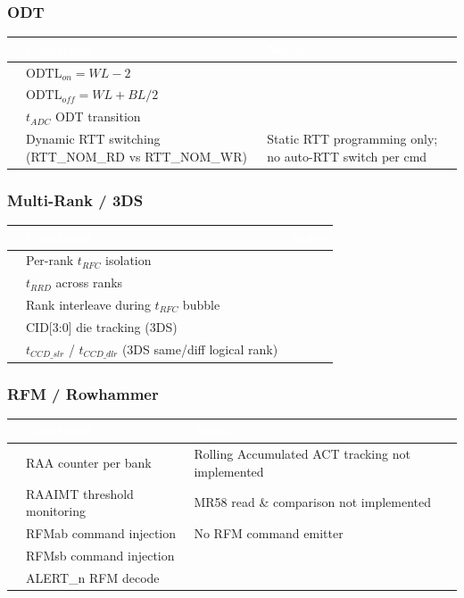 \documentclass[11pt,a4paper]{article}
\newcommand{\THead}[1]{\cellcolor{navy}\textcolor{white}{\small\textbf{#1}}}
\newcommand{\RA}{\rowcolor{lgray}}
\newcommand{\RB}{\rowcolor{sky!30}}
\newcommand{\cmark}{\textcolor{grn}{\ding{51}}}
\newcommand{\xmark}{\textcolor{red}{\ding{55}}}
\begin{document}
\subsubsection*{ODT}
\begin{center}
\begin{tabularx}{\linewidth}{@{} c l X @{}}
\toprule
\THead{} & \THead{Constraint} & \THead{Notes} \\
\midrule
\RA\cmark & $\text{ODTL}_{on} = WL-2$ & \\
\RB\cmark & $\text{ODTL}_{off} = WL+BL/2$ & \\
\RA\cmark & $t_{ADC}$ ODT transition & \\
\RB\xmark & Dynamic RTT switching (RTT\_NOM\_RD vs RTT\_NOM\_WR) &
  Static RTT programming only; no auto-RTT switch per cmd \\
\bottomrule
\end{tabularx}
\end{center}

\subsubsection*{Multi-Rank / 3DS}
\begin{center}
\begin{tabularx}{\linewidth}{@{} c l X @{}}
\toprule
\THead{} & \THead{Constraint} & \THead{Notes} \\
\midrule
\RA\cmark & Per-rank $t_{RFC}$ isolation & \\
\RB\cmark & $t_{RRD}$ across ranks & \\
\RA\cmark & Rank interleave during $t_{RFC}$ bubble & \\
\RB\cmark & CID[3:0] die tracking (3DS) & \\
\RA\cmark & $t_{CCD\_slr}$ / $t_{CCD\_dlr}$ (3DS same/diff logical rank) & \\
\bottomrule
\end{tabularx}
\end{center}

\subsubsection*{RFM / Rowhammer}
\begin{center}
\begin{tabularx}{\linewidth}{@{} c l X @{}}
\toprule
\THead{} & \THead{Constraint} & \THead{Notes} \\
\midrule
\RA\xmark & RAA counter per bank &
  Rolling Accumulated ACT tracking not implemented \\
\RB\xmark & RAAIMT threshold monitoring &
  MR58 read \& comparison not implemented \\
\RA\xmark & RFMab command injection &
  No RFM command emitter \\
\RB\xmark & RFMsb command injection & \\
\RA\xmark & ALERT\_n RFM decode & \\
\bottomrule
\end{tabularx}
\end{center}
\end{document}
